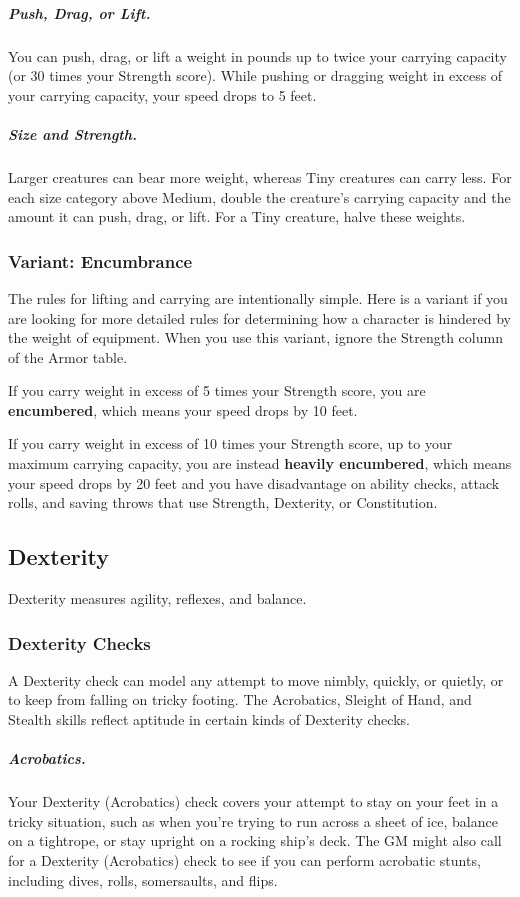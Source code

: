 \subparagraph*{Push, Drag, or Lift.} You can push, drag, or lift a weight in pounds up to twice your carrying capacity (or 30 times your Strength score). While pushing or dragging weight in excess of your carrying capacity, your speed drops to 5 feet.

\subparagraph*{Size and Strength.} Larger creatures can bear more weight, whereas Tiny creatures can carry less. For each size category above Medium, double the creature's carrying capacity and the amount it can push, drag, or lift. For a Tiny creature, halve these weights.

\subsubsection{Variant: Encumbrance}

The rules for lifting and carrying are intentionally simple. Here is a variant if you are looking for more detailed rules for determining how a character is hindered by the weight of equipment. When you use this variant, ignore the Strength column of the Armor table.

If you carry weight in excess of 5 times your Strength score, you are \textbf{encumbered}, which means your speed drops by 10 feet.

If you carry weight in excess of 10 times your Strength score, up to your maximum carrying capacity, you are instead \textbf{heavily encumbered}, which means your speed drops by 20 feet and you have disadvantage on ability checks, attack rolls, and saving throws that use Strength, Dexterity, or Constitution.

\subsection{Dexterity}

Dexterity measures agility, reflexes, and balance.

\subsubsection{Dexterity Checks}

A Dexterity check can model any attempt to move nimbly, quickly, or quietly, or to keep from falling on tricky footing. The Acrobatics, Sleight of Hand, and Stealth skills reflect aptitude in certain kinds of Dexterity checks.

\subparagraph*{Acrobatics.} Your Dexterity (Acrobatics) check covers your attempt to stay on your feet in a tricky situation, such as when you're trying to run across a sheet of ice, balance on a tightrope, or stay upright on a rocking ship's deck. The GM might also call for a Dexterity (Acrobatics) check to see if you can perform acrobatic stunts, including dives, rolls, somersaults, and flips.

